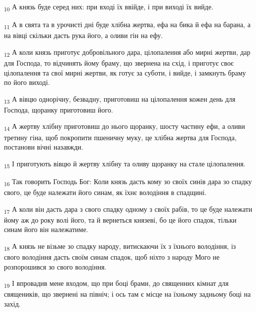 \begin{tcolorbox}
\textsubscript{10} А князь буде серед них: при вході їх ввійде, і при виході їх вийде.
\end{tcolorbox}
\begin{tcolorbox}
\textsubscript{11} А в свята та в урочисті дні буде хлібна жертва, ефа на бика й ефа на барана, а на вівці скільки дасть рука його, а оливи гін на ефу.
\end{tcolorbox}
\begin{tcolorbox}
\textsubscript{12} А коли князь приготує добровільного дара, цілопалення або мирні жертви, дар для Господа, то відчинять йому браму, що звернена на схід, і приготує своє цілопалення та свої мирні жертви, як готує за суботи, і вийде, і замкнуть браму по його виході.
\end{tcolorbox}
\begin{tcolorbox}
\textsubscript{13} А вівцю однорічну, безвадну, приготовиш на цілопалення кожен день для Господа, щоранку приготовиш його.
\end{tcolorbox}
\begin{tcolorbox}
\textsubscript{14} А жертву хлібну приготовиш до нього щоранку, шосту частину ефи, а оливи третину гіна, щоб покропити пшеничну муку, це хлібна жертва для Господа, постанови вічні назавжди.
\end{tcolorbox}
\begin{tcolorbox}
\textsubscript{15} І приготують вівцю й жертву хлібну та оливу щоранку на стале цілопалення.
\end{tcolorbox}
\begin{tcolorbox}
\textsubscript{16} Так говорить Господь Бог: Коли князь дасть кому зо своїх синів дара зо спадку свого, це буде належати його синам, як їхнє володіння в спадщині.
\end{tcolorbox}
\begin{tcolorbox}
\textsubscript{17} А коли він дасть дара з свого спадку одному з своїх рабів, то це буде належати йому аж до року волі його, та й вернеться князеві, бо це його спадок, тільки синам його він належатиме.
\end{tcolorbox}
\begin{tcolorbox}
\textsubscript{18} А князь не візьме зо спадку народу, витискаючи їх з їхнього володіння, із свого володіння дасть своїм синам спадок, щоб ніхто з народу Мого не розпорошився зо свого володіння.
\end{tcolorbox}
\begin{tcolorbox}
\textsubscript{19} І впровадив мене входом, що при боці брами, до священних кімнат для священиків, що звернені на північ; і ось там є місце на їхньому задньому боці на захід.
\end{tcolorbox}
